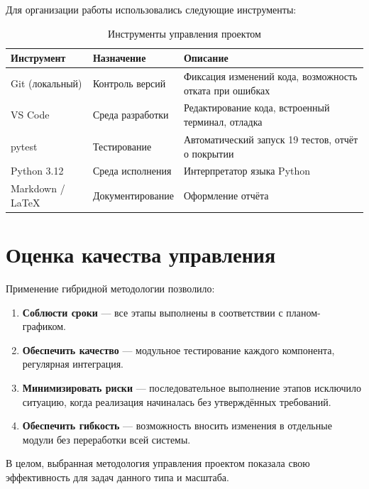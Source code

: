 Для организации работы использовались следующие инструменты:

\begin{table}[H]
\centering
\caption{Инструменты управления проектом}
\label{tab:tools}
\begin{tabular}{p{3.5cm}p{4cm}p{8cm}}
\toprule
\textbf{Инструмент} & \textbf{Назначение} & \textbf{Описание} \\
\midrule
Git (локальный) & Контроль версий & Фиксация изменений кода, возможность отката при ошибках \\
VS Code & Среда разработки & Редактирование кода, встроенный терминал, отладка \\
pytest & Тестирование & Автоматический запуск 19 тестов, отчёт о покрытии \\
Python 3.12 & Среда исполнения & Интерпретатор языка Python \\
Markdown / \LaTeX & Документирование & Оформление отчёта \\
\bottomrule
\end{tabular}
\end{table}

\section{Оценка качества управления}

Применение гибридной методологии позволило:

\begin{enumerate}
    \item \textbf{Соблюсти сроки} — все этапы выполнены в соответствии с планом-графиком.
    \item \textbf{Обеспечить качество} — модульное тестирование каждого компонента, регулярная интеграция.
    \item \textbf{Минимизировать риски} — последовательное выполнение этапов исключило ситуацию, когда реализация начиналась без утверждённых требований.
    \item \textbf{Обеспечить гибкость} — возможность вносить изменения в отдельные модули без переработки всей системы.
\end{enumerate}

В целом, выбранная методология управления проектом показала свою эффективность для задач данного типа и масштаба.
